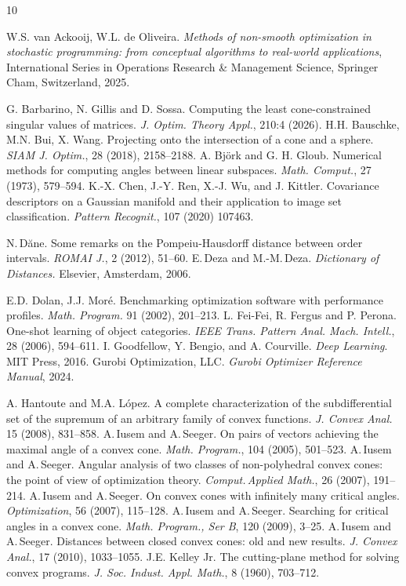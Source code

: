\documentclass[hidelinks,onefignum,onetabnum]{siamart250211}
\theoremstyle{definition}
\theoremstyle{remark}
\begin{document}
 \begin{thebibliography}{10}
{\small
%
 W.S. {van Ackooij}, W.L. {de Oliveira}.
 \emph{Methods of non-smooth optimization in stochastic programming: from conceptual algorithms to real-world applications},  International Series in Operations Research \& Management Science, Springer Cham, Switzerland, 2025.

 G. Barbarino, N. Gillis and D. Sossa. Computing the least cone-constrained singular values of matrices. \emph{J. Optim. Theory Appl.}, 210:4 (2026).
%
 H.H. Bauschke, M.N. Bui, X. Wang. Projecting onto the intersection of a cone and a sphere.
\emph{SIAM J. Optim.}, 28 (2018), 2158--2188.
%
 A. Bj\"ork and G. H. Gloub. Numerical methods for computing angles between linear subspaces. \emph{Math. Comput.},  27 (1973), 579--594.
%
 K.-X. Chen, J.-Y. Ren, X.-J. Wu, and J. Kittler. Covariance descriptors on a Gaussian manifold and their application to image set classification. \emph{Pattern Recognit.}, 107 (2020) 107463.

%
 N.\,D\u{a}ne. Some remarks on the Pompeiu-Hausdorff distance between order intervals. \emph{ROMAI J.}, 2 (2012), 51--60.
%
 E.\,Deza and M.-M.\,Deza. \emph{Dictionary of Distances.} Elsevier, Amsterdam, 2006.

 E.D. Dolan, J.J. Moré. Benchmarking optimization software with performance profiles. \emph{Math. Program.} 91 (2002), 201--213. 
%
L. Fei-Fei, R. Fergus and P. Perona.
One-shot learning of object categories. 
\emph{IEEE Trans. Pattern Anal. Mach. Intell.}, 28 (2006), 594--611.
%
I. Goodfellow, Y. Bengio, and A. Courville. \emph{ Deep Learning}. MIT Press, 2016.
%
 Gurobi Optimization, LLC. \emph{Gurobi Optimizer Reference Manual}, 2024.


A. Hantoute and M.A. López. A complete characterization of the subdifferential set of the supremum of an arbitrary family of convex functions. \emph{J. Convex Anal.} 15 (2008), 831--858.
%
 A.\,Iusem and A.\,Seeger. On pairs of vectors achieving the maximal angle of a convex cone. \emph{Math. Program.}, 104 (2005), 501--523.
%
A.\,Iusem and A.\,Seeger.
Angular analysis of two classes of non-polyhedral convex cones: the point of view of optimization theory.
\emph{Comput.\,Applied Math.}, 26  (2007), 191--214.
%
%
 A.\,Iusem and A.\,Seeger. On convex cones with infinitely many critical angles. \emph{Optimization}, 56 (2007), 115--128.
%
 A.\,Iusem and A.\,Seeger. Searching for critical angles in a convex cone. \emph{Math. Program., Ser B}, 120 (2009), 3--25.
%
 A.\,Iusem and A.\,Seeger. Distances between closed convex cones: old and new results. \emph{J. Convex Anal.}, 17 (2010), 1033--1055.
%
 J.E. {Kelley Jr.}
The cutting-plane method for solving convex programs.
\emph{J. Soc. Indust. Appl. Math.}, 8 (1960), 703--712.
%

}
\end{thebibliography}
\end{document}
